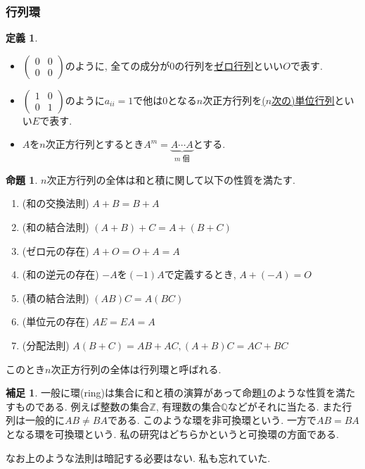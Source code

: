 \documentclass[dvipdfmx,a4paper,11pt]{article}
\newcommand{\Z}{\mathbb{Z}}
\newcommand{\Q}{\mathbb{Q}}
\theoremstyle{definition}
\newtheorem{prop}[thm]{命題}
\newtheorem{dfn}[thm]{定義}
\newtheorem{rem}[thm]{補足}
\begin{document}
  \subsubsection{行列環}
\begin{tcolorbox}[
    colback = white,
    colframe = green!35!black,
    fonttitle = \bfseries,
    breakable = true]
    \begin{dfn}
\begin{itemize}
\setlength{\parskip}{0cm}
 \setlength{\itemsep}{0pt} 
\item   $\begin{pmatrix}
0&0\\
0 &0
 \end{pmatrix}$のように, 全ての成分が0の行列を\underline{ゼロ行列}といい$O$で表す.
\item $ \begin{pmatrix}
1&0\\
0 &1
 \end{pmatrix}$のように$a_{ii}=1$で他は0となる$n$次正方行列を\underline{($n$次の)単位行列}といい$E$で表す.
 \item $A$を$n$次正方行列とするとき$A^{m} = \underbrace{A \cdots A}_{m \text{ 個}}$とする. 
\end{itemize}
\end{dfn}
 \end{tcolorbox}
 


\begin{tcolorbox}[
    colback = white,
    colframe = green!35!black,
    fonttitle = \bfseries,
    breakable = true]
    \begin{prop}\cite[命題2.3]{M}
    \label{prop-2.3}
$n$次正方行列の全体は和と積に関して以下の性質を満たす. 
\begin{enumerate}
\setlength{\parskip}{0cm}
 \setlength{\itemsep}{0pt} 
\item (和の交換法則) $A+B = B+A$
\item (和の結合法則) $(A+B) + C = A + (B+C)$
\item (ゼロ元の存在) $A+O = O+A=A$
\item (和の逆元の存在) $-A$を$(-1)A$で定義するとき, $A + (-A)=O$
\item (積の結合法則) $(AB) C = A (BC)$
\item (単位元の存在) $AE =EA=A$
\item (分配法則) $A(B+C)=AB + AC, (A+B)C = AC + BC$
\end{enumerate}
このとき$n$次正方行列の全体は行列環と呼ばれる.
\end{prop}
 \end{tcolorbox}
 \begin{rem}
 一般に環(ring)は集合に和と積の演算があって命題\ref{prop-2.3}のような性質を満たすものである. 
 例えば整数の集合$\Z$, 有理数の集合$\Q$などがそれに当たる.
 また行列は一般的に$AB \neq BA$である. このような環を非可換環という. 
 一方で$AB=BA$となる環を可換環という. 
 私の研究はどちらかというと可換環の方面である. 
 
なお上のような法則は暗記する必要はない. 私も忘れていた.
 \end{rem}
 
\end{document}
